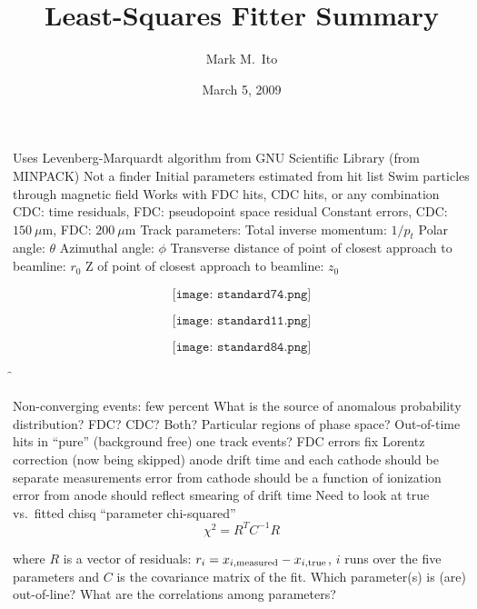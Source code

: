 \documentclass[xcolor=dvipsnames]{beamer}
\begin{document}
\title{Least-Squares Fitter Summary}
\author[M.\ Ito]{Mark M.\ Ito}
\date{March 5, 2009}

\f{
\bi
\I Uses Levenberg-Marquardt algorithm from GNU Scientific Library (from MINPACK)
\I Not a finder
\I Initial parameters estimated from hit list
\I Swim particles through magnetic field
\I Works with FDC hits, CDC hits, or any combination
\I CDC: time residuals, FDC: pseudopoint space residual
\I Constant errors, CDC: $150~\mu$m, FDC: $200~\mu$m
\I Track parameters:
  \be
  \I Total inverse momentum: $1/p_t$
  \I Polar angle: $\theta$
  \I Azimuthal angle: $\phi$
  \I Transverse distance of point of closest approach to beamline: $r_0$
  \I Z of point of closest approach to beamline: $z_0$
  \ee
\ei
}

\f{
$$
\texttt{[image: standard74.png]}
$$
}

\f{
$$
\texttt{[image: standard11.png]}
$$
}

\f{
$$
\texttt{[image: standard84.png]}
$$
}

\f{
\be
\I Non-converging events: few percent
\I What is the source of anomalous probability distribution?
  \be
  \I FDC? CDC? Both?
  \I Particular regions of phase space?
  \I Out-of-time hits in ``pure'' (background free) one track events?
  \ee
\I FDC errors
  \be
  \I fix Lorentz correction (now being skipped)
  \I anode drift time and each cathode should be separate measurements
  \I error from cathode should be a function of ionization
  \I error from anode should reflect smearing of drift time
  \ee
\I Need to look at true vs.\ fitted chisq ``parameter chi-squared''
$$
\chi^2 = R^T C^{-1} R
$$

where $R$ is a vector of residuals: $r_i = x_{i,{\rm measured}} - x_{i,{\rm true}}$, $i$ runs over the five parameters and $C$ is the covariance
matrix of the fit.
  \be
  \I Which parameter(s) is (are) out-of-line?
  \I What are the correlations among parameters?
  \ee
\ee
}
\end{document}
